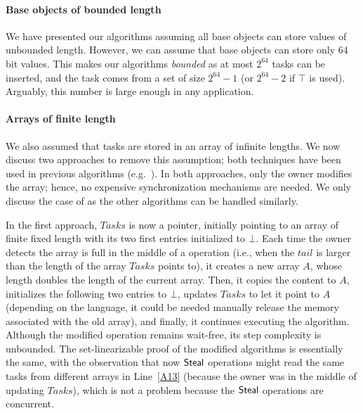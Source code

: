 \paragraph*{Base objects of bounded length}
We have presented our algorithms assuming all base objects can store values of unbounded length.  However, we can assume that base objects can store only \(64\) bit values. This makes our algorithms \emph{bounded} as at most \(2^{64}\) tasks can be inserted, and the task comes from a set of size \(2^{64} - 1\) (or \(2^{64} - 2\) if \(\top\) is used).  Arguably, this number is large enough in any application.


\paragraph*{Arrays of finite length}
We also assumed that tasks are stored in an array of infinite lengths. We now discuss two approaches to remove this assumption; both techniques have been used in previous algorithms (e.g.~\cite{DBLP_conf_wdag_AdasF20, DBLP_conf_opodis_AfekKY10, maged.vechev.2009, non.blocking.work.stealing, DBLP_conf_ppopp_YangM16}).  In both approaches, only the owner modifies the array; hence, no expensive synchronization mechanisms are needed.  We only discuss the case of \WFWSM{} as the other algorithms can be handled similarly.

In the first approach, \(Tasks\) is now a pointer, initially pointing to an array of finite fixed length with its two first entries initialized to \(\bot\). Each time the owner detects the array is full in the middle of a \Put{} operation (i.e., when the \(tail\) is larger than the length of the array \(Tasks\) points to), it creates a new array \(A\), whose length doubles the length of the current array.  Then, it copies the content to \(A\), initializes the following two entries to \(\bot\), updates \(Tasks\) to let it point to \(A\) (depending on the language, it could be needed manually release the memory associated with the old array), and finally, it continues executing the algorithm. Although the modified \Put{} operation remains wait-free, its step complexity is unbounded.  The set-linearizable proof of the modified algorithms is essentially the same, with the observation that now ${\sf Steal}$ operations might read the same tasks from different arrays in Line~\ref{A13} (because the owner was in the middle of updating $Tasks$), which is not a problem because the ${\sf Steal}$ operations are concurrent.

